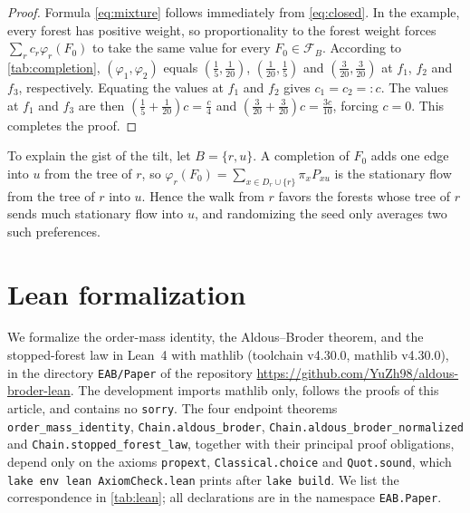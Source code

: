 \documentclass[onefignum,onetabnum,nohypdvips]{siamart250211}
\numberwithin{theorem}{section}
\numberwithin{equation}{section}
\begin{document}
\begin{proof}
Formula \eqref{eq:mixture} follows immediately from \eqref{eq:closed}. In the example, every forest
has positive weight, so proportionality to the forest weight forces
$\sum_rc_r\varphi_r(F_0)$ to take the same value for every $F_0\in\mathcal F_B$. According to \cref{tab:completion}, $(\varphi_1,\varphi_2)$ equals
$(\tfrac15,\tfrac1{20})$, $(\tfrac1{20},\tfrac15)$ and
$(\tfrac3{20},\tfrac3{20})$ at $f_1$, $f_2$ and $f_3$, respectively. Equating the values at $f_1$ and
$f_2$ gives $c_1=c_2=:c$. The values at $f_1$ and $f_3$ are then
$(\tfrac15+\tfrac1{20})c=\tfrac c4$ and $(\tfrac3{20}+\tfrac3{20})c=\tfrac{3c}{10}$, forcing $c=0$. This completes the proof.
\end{proof}

To explain the gist of the tilt, let $B=\{r,u\}$. A completion of $F_0$ adds one
edge into $u$ from the tree of $r$, so
$\varphi_r(F_0)=\sum_{x\in D_r\cup\{r\}}\pi_xP_{xu}$ is the stationary
flow from the tree of $r$ into $u$. Hence the walk from $r$ favors the
forests whose tree of $r$ sends much stationary flow into $u$, and
randomizing the seed only averages two such preferences.

\section{Lean formalization}\label{sec:sm-lean}

\begin{sloppypar}
We formalize the order-mass identity, the Aldous--Broder theorem,
and the stopped-forest law in Lean~4
\cite{deMouraUllrich2021} with mathlib \cite{mathlib2020} (toolchain
v4.30.0, mathlib v4.30.0), in the directory \texttt{EAB/Paper}
of the repository \url{https://github.com/YuZh98/aldous-broder-lean}. The development imports mathlib only,
follows the proofs of this article, and contains no \texttt{sorry}. The four endpoint theorems \texttt{order\_mass\_identity},
\texttt{Chain.aldous\_broder}, \texttt{Chain.aldous\_broder\_normalized}
and \texttt{Chain.stopped\_forest\_law}, together with their principal
proof obligations, depend only on the axioms \texttt{propext},
\texttt{Classical.choice} and \texttt{Quot.sound}, which
\texttt{lake env lean AxiomCheck.lean} prints after \texttt{lake build}.
We list the correspondence in \cref{tab:lean}; all declarations are in
the namespace \texttt{EAB.Paper}.
\end{sloppypar}
\end{document}
